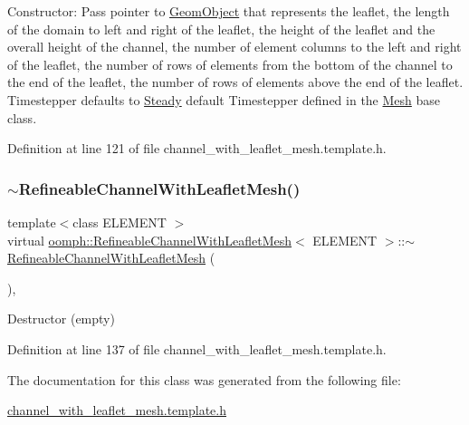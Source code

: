 Constructor\+: Pass pointer to \hyperlink{classoomph_1_1GeomObject}{Geom\+Object} that represents the leaflet, the length of the domain to left and right of the leaflet, the height of the leaflet and the overall height of the channel, the number of element columns to the left and right of the leaflet, the number of rows of elements from the bottom of the channel to the end of the leaflet, the number of rows of elements above the end of the leaflet. Timestepper defaults to \hyperlink{classoomph_1_1Steady}{Steady} default Timestepper defined in the \hyperlink{classoomph_1_1Mesh}{Mesh} base class. 



Definition at line 121 of file channel\+\_\+with\+\_\+leaflet\+\_\+mesh.\+template.\+h.

\mbox{\label{classoomph_1_1RefineableChannelWithLeafletMesh_aed441c6ae7a9078b649d733a033bd2b5}} 
\subsubsection{\texorpdfstring{$\sim$\+Refineable\+Channel\+With\+Leaflet\+Mesh()}{~RefineableChannelWithLeafletMesh()}}
{\footnotesize\ttfamily template$<$class E\+L\+E\+M\+E\+NT $>$ \\
virtual \hyperlink{classoomph_1_1RefineableChannelWithLeafletMesh}{oomph\+::\+Refineable\+Channel\+With\+Leaflet\+Mesh}$<$ E\+L\+E\+M\+E\+NT $>$\+::$\sim$\hyperlink{classoomph_1_1RefineableChannelWithLeafletMesh}{Refineable\+Channel\+With\+Leaflet\+Mesh} (\begin{DoxyParamCaption}{ }\end{DoxyParamCaption})\hspace{0.3cm}{\ttfamily [inline]}, {\ttfamily [virtual]}}



Destructor (empty) 



Definition at line 137 of file channel\+\_\+with\+\_\+leaflet\+\_\+mesh.\+template.\+h.



The documentation for this class was generated from the following file\+:\begin{DoxyCompactItemize}
\item 
\hyperlink{channel__with__leaflet__mesh_8template_8h}{channel\+\_\+with\+\_\+leaflet\+\_\+mesh.\+template.\+h}\end{DoxyCompactItemize}

